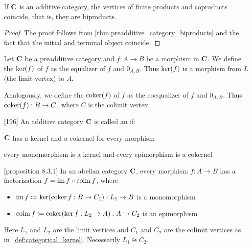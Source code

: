 \begin{theorem}\label{thm:additive_category_biproducts}
  If \( \operatorname{\mathbf{C}} \) is an additive category, the vertices of finite products and coproducts coincide, that is, they are biproducts.
\end{theorem}
\begin{proof}
  The proof follows from \cref{thm:preadditive_category_biproducts} and the fact that the initial and terminal object coincide.
\end{proof}

\begin{definition}\label{def:categorical_kernel}
  Let \( \operatorname{\mathbf{C}} \) be a preadditive category and \( f: A \to B \) be a morphism in \( \operatorname{\mathbf{C}} \). We define the  \( \operatorname{ker}(f) \) of \( f \) as the equalizer of \( f \) and \( 0_{A,B} \). Thus \( \operatorname{ker}(f) \) is a morphism from \( L \) (the limit vertex) to \( A \).

  Analogously, we define the  \( \operatorname{coker}(f) \) of \( f \) as the coequalizer of \( f \) and \( 0_{A,B} \). Thus \( \operatorname{coker}(f): B \to C \), where \( C \) is the colimit vertex.
\end{definition}

\begin{definition}\label{def:abelian_category}\cite{MacLane1994}[196]
  An additive category \( \operatorname{\mathbf{C}} \) is called an  if:
  \begin{defenum}
    \item \( \operatorname{\mathbf{C}} \) has a kernel and a cokernel for every morphism
    \item every monomorphism is a kernel and every epimorphism is a cokernel
  \end{defenum}
\end{definition}

\begin{proposition}\label{def:abelian_category_morphism_factorization}\cite{MacLane1994}[proposition 8.3.1]
  In an abelian category \( \operatorname{\mathbf{C}} \), every morphism \( f: A \to B \) has a factorization \( f = \operatorname{im} f \circ \operatorname{coim} f \), where
  \begin{itemize}
    \item \( \operatorname{im} f \coloneqq \operatorname{ker}(\operatorname{coker} f: B \to C_1): L_1 \to B \) is a monomorphism
    \item \( \operatorname{coim} f \coloneqq \operatorname{coker}(\operatorname{ker} f: L_2 \to A): A \to C_2 \) is an epimorphism
  \end{itemize}
  Here \( L_1 \) and \( L_2 \) are the limit vertices and \( C_1 \) and \( C_2 \) are the colimit vertices as in~\cref{def:categorical_kernel}. Necessarily \( L_1 \cong C_2 \).
\end{proposition}

